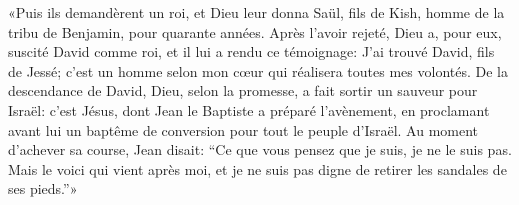 «Puis ils demandèrent un roi, et Dieu leur donna Saül, fils de Kish,
	homme de la tribu de Benjamin, pour quarante années.
Après l’avoir rejeté,
	Dieu a, pour eux, suscité David comme roi, et il lui a rendu ce témoignage:
	J’ai trouvé David, fils de Jessé;
	c’est un homme selon mon cœur qui réalisera toutes mes volontés.
De la descendance de David,
	Dieu, selon la promesse, a fait sortir un sauveur pour Israël:
	c’est Jésus, dont Jean le Baptiste a préparé l’avènement,
	en proclamant avant lui un baptême de conversion pour tout le peuple d’Israël.
Au moment d’achever sa course, Jean disait:
	“Ce que vous pensez que je suis, je ne le suis pas.
	Mais le voici qui vient après moi,
	et je ne suis pas digne de retirer les sandales de ses pieds.”»
